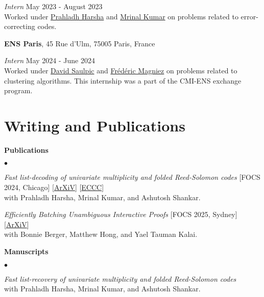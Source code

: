 \documentclass[margin,line, 10pt]{res}
\newenvironment{list2}{
  \begin{list}{$\bullet$}{%
      \setlength{\itemsep}{0in}
      \setlength{\parsep}{0in} \setlength{\parskip}{0in}
      \setlength{\topsep}{0in} \setlength{\partopsep}{0in} 
      \setlength{\leftmargin}{0.2in}}}{\end{list}}
\begin{document}
\begin{resume}
\vspace{-.3cm}
{\em Intern} \hfill {May 2023 - August 2023}\\
Worked under \href{https://www.tifr.res.in/~prahladh/}{Prahladh Harsha} and \href{https://mrinalkr.bitbucket.io/}{Mrinal Kumar} on problems related to error-correcting codes.

{\bf ENS Paris}, 45 Rue d'Ulm, 75005 Paris, France

\vspace{-.3cm}
{\em Intern} \hfill {May 2024 - June 2024}\\
Worked under \href{https://www.normalesup.org/~saulpic/}{David Saulpic} and \href{https://www.irif.fr/~magniez/}{Frédéric Magniez} on problems related to clustering algorithms. This internship was a part of the CMI-ENS exchange program.



\section{\sc Writing and Publications}


\vspace{-.1cm}

{\bf Publications}
\begin{list2}
    \item \textit{Fast list-decoding of univariate multiplicity and folded Reed-Solomon codes} {\hfill[FOCS 2024, Chicago]}
    [\href{https://arxiv.org/abs/2311.17841}{ArXiV}]
    [\href{https://eccc.weizmann.ac.il/report/2023/185/}{ECCC}]\\
     with Prahladh Harsha, Mrinal Kumar, and Ashutosh Shankar.
    \item \textit{Efficiently Batching Unambiguous Interactive Proofs} {\hfill [FOCS 2025, Sydney]}\\
    {[\href{https://arxiv.org/abs/2510.19075}{ArXiV}]}\\
    with Bonnie Berger, Matthew Hong, and Yael Tauman Kalai. 
\end{list2}
    
{\bf Manuscripts}
\begin{list2}
    \item \textit{Fast list-recovery of univariate multiplicity and folded Reed-Solomon codes}\\
    with Prahladh Harsha, Mrinal Kumar, and Ashutosh Shankar.
\end{list2}


\end{resume}
\end{document}
